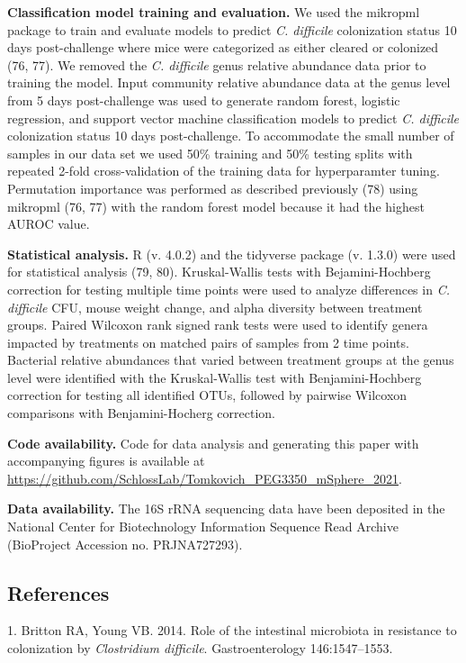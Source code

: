 \documentclass[
  11pt,
]{article}
\begin{document}
\textbf{Classification model training and evaluation.} We used the
mikropml package to train and evaluate models to predict \emph{C.
difficile} colonization status 10 days post-challenge where mice were
categorized as either cleared or colonized (76, 77). We removed the
\emph{C. difficile} genus relative abundance data prior to training the
model. Input community relative abundance data at the genus level from 5
days post-challenge was used to generate random forest, logistic
regression, and support vector machine classification models to predict
\emph{C. difficile} colonization status 10 days post-challenge. To
accommodate the small number of samples in our data set we used 50\%
training and 50\% testing splits with repeated 2-fold cross-validation
of the training data for hyperparamter tuning. Permutation importance
was performed as described previously (78) using mikropml (76, 77) with
the random forest model because it had the highest AUROC value.

\textbf{Statistical analysis.} R (v. 4.0.2) and the tidyverse package
(v. 1.3.0) were used for statistical analysis (79, 80). Kruskal-Wallis
tests with Bejamini-Hochberg correction for testing multiple time points
were used to analyze differences in \emph{C. difficile} CFU, mouse
weight change, and alpha diversity between treatment groups. Paired
Wilcoxon rank signed rank tests were used to identify genera impacted by
treatments on matched pairs of samples from 2 time points. Bacterial
relative abundances that varied between treatment groups at the genus
level were identified with the Kruskal-Wallis test with
Benjamini-Hochberg correction for testing all identified OTUs, followed
by pairwise Wilcoxon comparisons with Benjamini-Hocherg correction.

\textbf{Code availability.} Code for data analysis and generating this
paper with accompanying figures is available at
\url{https://github.com/SchlossLab/Tomkovich_PEG3350_mSphere_2021}.

\textbf{Data availability.} The 16S rRNA sequencing data have been
deposited in the National Center for Biotechnology Information Sequence
Read Archive (BioProject Accession no. PRJNA727293).

\newpage

\hypertarget{references}{%
\subsection{References}\label{references}}

\hypertarget{refs}{}
\leavevmode\hypertarget{ref-Britton2014}{}%
1. Britton RA, Young VB. 2014. Role of the intestinal microbiota in
resistance to colonization by \emph{Clostridium difficile}.
Gastroenterology 146:1547--1553.
\end{document}
